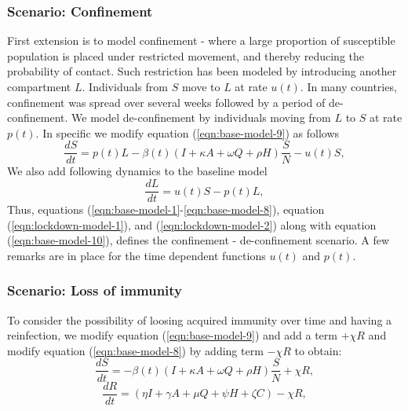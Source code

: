 \documentclass[fleqn,10pt]{wlscirep}
\begin{document}
\subsubsection*{Scenario: Confinement}
First extension is to model confinement - where a large proportion of susceptible population is placed under restricted movement, and thereby reducing the probability of contact. Such restriction has been modeled by introducing another compartment $L$. Individuals from $S$ move to $L$ at rate $u(t)$. In many countries, confinement was spread over several weeks followed by a period of de-confinement. We model de-confinement by individuals moving from $L$ to $S$ at rate $p(t)$. In specific we modify equation (\ref{eqn:base-model-9}) as follows
\begin{equation}
\frac{dS}{dt} = p(t)L -\beta(t) \left( I + \kappa A + \omega Q + \rho H \right) \frac{S}{N} - u(t)S,
\label{eqn:lockdown-model-1}
\end{equation}
%
%
We also add following dynamics to the baseline model 
\begin{equation}
\frac{dL}{dt} = u(t)S - p(t)L,
\label{eqn:lockdown-model-2}
\end{equation}
Thus, equations (\ref{eqn:base-model-1}-\ref{eqn:base-model-8}), equation (\ref{eqn:lockdown-model-1}), and (\ref{eqn:lockdown-model-2}) along with equation (\ref{eqn:base-model-10}), defines the confinement - de-confinement scenario. A few remarks are in place for the time dependent functions $u(t)$ and $p(t)$.

\subsubsection*{Scenario: Loss of immunity}
To consider the possibility of loosing acquired immunity over time and having a reinfection, we modify  equation (\ref{eqn:base-model-9}) and add a term $+\chi R$ and modify equation (\ref{eqn:base-model-8}) by adding term $-\chi R$ to obtain:
%
%
\begin{equation}
\frac{dS}{dt} = -\beta(t) \left( I + \kappa A + \omega Q + \rho H \right) \frac{S}{N} +\chi R,
\label{eqn:loss_immunity-model-8}
\end{equation}
%
%
\begin{equation}
\frac{dR}{dt} =  \left( \eta I +  \gamma A + \mu Q + \psi H + \zeta C \right) -\chi R,
\label{eqn:loss_immunity-model-9}
\end{equation}
%
\end{document}
